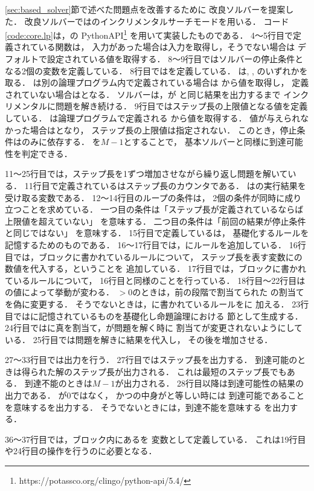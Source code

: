 {\color{red}
\ref{sec:based_solver}節で述べた問題点を改善するために
改良ソルバーを提案した．
改良ソルバーでは{\clingo}のインクリメンタルサーチモードを用いる．
コード\ref{code:core.lp}は，{\clingo}の 
PythonAPI\footnote{https://potassco.org/clingo/python-api/5.4/} 
を用いて実装したものである．
4～5行目で定義されている関数は，
入力があった場合は入力を取得し，そうでない場合は
デフォルトで設定されている値を取得する．
8～9行目ではソルバーの停止条件となる2個の変数を定義している．
8行目ではを定義している．
は, , 
のいずれかを取る．
は別の論理プログラム内で定義されている場合は
から値を取得し，
定義されていない場合はとなる．
ソルバーは，{\clingo}が
と同じ結果を出力するまで
インクリメンタルに問題を解き続ける．
9行目ではステップ長の上限値となる値を定義している．
は論理プログラムで定義される
から値を取得する．
値が与えられなかった場合はとなり，
ステップ長の上限値は指定されない．
このとき，停止条件はのみに依存する．
を$M-1$とすることで，
基本ソルバーと同様に到達可能性を判定できる．

11～25行目では，ステップ長を1ずつ増加させながら繰り返し問題を解いている．
11行目で定義されているはステップ長のカウンタである．
は{\clingo}の実行結果を受け取る変数である．
12～14行目のループの条件は，
2個の条件が同時に成り立つことを求めている．
一つ目の条件は「ステップ長が定義されているならば上限値を超えていない」
を意味する．
二つ目の条件は「前回の結果が停止条件と同じではない」
を意味する．
15行目で定義しているは，
基礎化するルールを記憶するためのものである．
16～17行目では，にルールを追加している．
16行目では，ブロックに書かれているルールについて，
ステップ長を表す変数にの数値を代入する，ということを
追加している．
17行目では，ブロックに書かれているルールについて，
16行目と同様のことを行っている．
18行目～22行目はの値によって挙動が変わる．
$ > 0$のときは，前の段階で割当てられた
の割当てを偽に変更する．
そうでないときは，に書かれているルールをに
加える．
23行目ではに記憶されているものを基礎化し命題論理における
節として生成する．
24行目ではに真を割当て，{\clingo}が問題を解く時に
割当てが変更されないようにしている．
25行目では問題を解きに結果を代入し，
その後を増加させる．

27～33行目では出力を行う．
27行目ではステップ長を出力する．
到達可能のときは得られた解のステップ長が出力される．
これは最短のステップ長でもある．
到達不能のときは$M-1$が出力される．
28行目以降は到達可能性の結果の出力である．
が$0$ではなく，
かつの中身がと等しい時には
到達可能であることを意味するを出力する．
そうでないときには，到達不能を意味する
を出力する．

36～37行目では，ブロック内にあるを
変数として定義している．
これは19行目や24行目の操作を行うのに必要となる．
}

